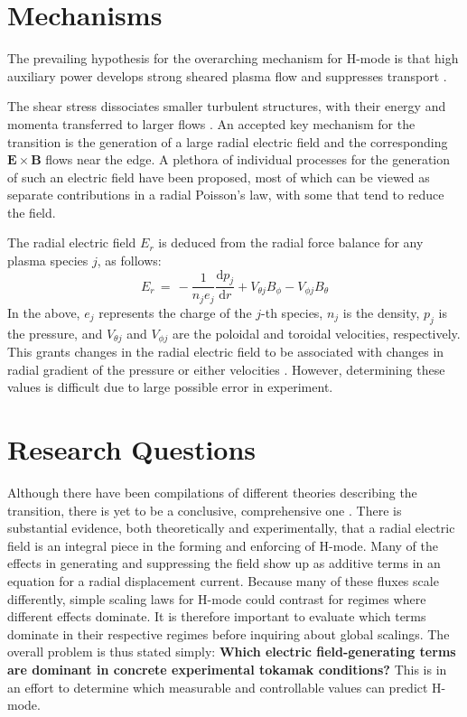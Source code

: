 \section{Mechanisms}
The prevailing hypothesis for the overarching mechanism for H-mode is that high auxiliary power develops strong sheared plasma flow and suppresses transport \cite{freidberg_plasma_2007}.

The shear stress dissociates smaller turbulent structures, with their energy and momenta transferred to larger flows \cite{staps_backstepping_2017}.
An accepted key mechanism for the transition is the generation of a large radial electric field and the corresponding $\mathbf{E}\times\mathbf{B}$ flows near the edge.
A plethora of individual processes for the generation of such an electric field have been proposed, most of which can be viewed as separate contributions in a radial Poisson's law, with some that tend to reduce the field.

The radial electric field $E_r$ is deduced from the radial force balance for any plasma species $j$, as follows:
\begin{equation}
	E_r \,=\, -\frac{1}{n_j e_j} \frac{\text{d} p_j}{\text{d} r} + V_{\theta j} B_\phi - V_{\phi j} B_\theta
	\label{eq:E_r}
\end{equation}
In the above, $e_j$ represents the charge of the $j$-th species, $n_j$ is the density, $p_j$ is the pressure, and $V_{\theta j}$ and $V_{\phi j}$ are the poloidal and toroidal velocities, respectively.
This grants changes in the radial electric field to be associated with changes in radial gradient of the pressure or either velocities \cite{connor_review_2000}\cite{staps_backstepping_2017}.
However, determining these values is difficult due to large possible error in experiment.

\section{Research Questions}
Although there have been compilations of different theories describing the transition, there is yet to be a conclusive, comprehensive one \cite{connor_review_2000}.
There is substantial evidence, both theoretically and experimentally, that a radial electric field is an integral piece in the forming and enforcing of H-mode.
Many of the effects in generating and suppressing the field show up as additive terms in an equation for a radial displacement current.
Because many of these fluxes scale differently, simple scaling laws for H-mode could contrast for regimes where different effects dominate.
It is therefore important to evaluate which terms dominate in their respective regimes before inquiring about global scalings.
The overall problem is thus stated simply: \textbf{Which electric field-generating terms are dominant in concrete experimental tokamak conditions?}
This is in an effort to determine which measurable and controllable values can predict H-mode.

